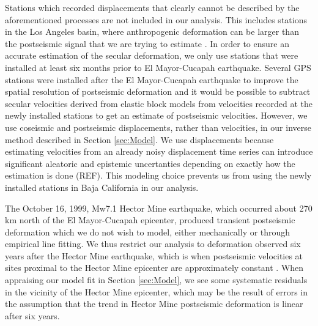 \documentclass[1p]{elsarticle}
\begin{document}
Stations which recorded displacements that clearly cannot be described by the aforementioned processes are not included in our analysis. This includes stations in the Los Angeles basin, where anthropogenic deformation can be larger than the postseismic signal that we are trying to estimate \citep{Bawden2001,Argus2005} . In order to ensure an accurate estimation of the secular deformation, we only use stations that were installed at least six months prior to El Mayor-Cucapah earthquake. Several GPS stations were installed after the El Mayor-Cucapah earthquake to improve the spatial resolution of postseismic deformation \citep{Spinler2015} and it would be possible to subtract secular velocities derived from elastic block models \citep[e.g.][]{Meade2005} from velocities recorded at the newly installed stations to get an estimate of postseismic velocities. However, we use coseismic and postseismic displacements, rather than velocities, in our inverse method described in Section \ref{sec:Model}. We use displacements because estimating velocities from an already noisy displacement time series can introduce significant aleatoric and epistemic uncertanties depending on exactly how the estimation is done (REF). This modeling choice prevents us from using the newly installed stations in Baja California in our analysis.   

The October 16, 1999, Mw7.1 Hector Mine earthquake, which occurred about 270 km north of the El Mayor-Cucapah epicenter, produced transient postseismic deformation which we do not wish to model, either mechanically or through empirical line fitting.  We thus restrict our analysis to deformation observed six years after the Hector Mine earthquake, which is when postseismic velocities at sites proximal to the Hector Mine epicenter are approximately constant \citep{Savage2009}. When appraising our model fit in Section \ref{sec:Model}, we see some systematic residuals in the vicinity of the Hector Mine epicenter, which may be the result of errors in the assumption that the trend in Hector Mine postseismic deformation is linear after six years.   
\end{document}
